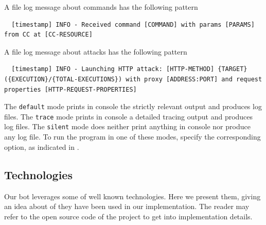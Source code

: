 A file log message about commands has the following pattern

\begin{verbatim}
  [timestamp] INFO - Received command [COMMAND] with params [PARAMS] from CC at [CC-RESOURCE]
\end{verbatim}

A file log message about attacks has the following pattern

\begin{verbatim}
  [timestamp] INFO - Launching HTTP attack: [HTTP-METHOD] {TARGET} ({EXECUTION}/{TOTAL-EXECUTIONS}) with proxy [ADDRESS:PORT] and request properties [HTTP-REQUEST-PROPERTIES]
\end{verbatim}


The \texttt{default} mode prints in console the strictly relevant output and produces log files. The \texttt{trace} mode prints in console a detailed tracing output and produces log files. The \texttt{silent} mode does neither print anything in console nor produce any log file.
To run the program in one of these modes, specify the corresponding option, as indicated in .


\subsection{Technologies}
\label{sec:technologies}

Our bot leverages some of well known technologies. Here we present them, giving an idea about of they have been used in our implementation. The reader may refer to the open source code of the project to get into implementation details.

